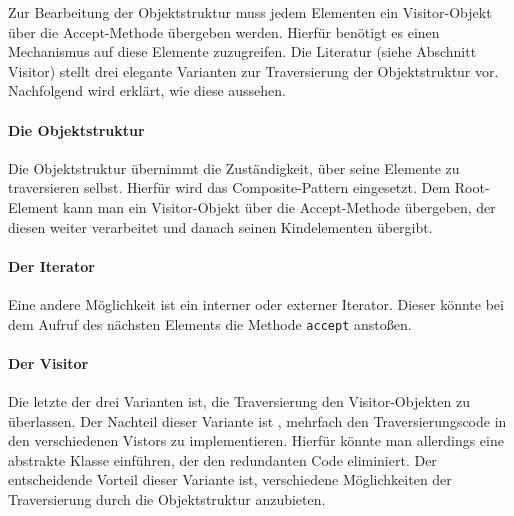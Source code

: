 Zur Bearbeitung der Objektstruktur muss jedem Elementen ein Visitor-Objekt über die Accept-Methode übergeben werden. Hierfür benötigt es einen Mechanismus auf diese Elemente zuzugreifen.
Die Literatur (siehe \cite{GOF95} Abschnitt Visitor) stellt drei elegante Varianten zur Traversierung der Objektstruktur vor. Nachfolgend wird erklärt, wie diese aussehen.
\paragraph{Die Objektstruktur} Die Objektstruktur übernimmt die Zuständigkeit, über seine Elemente zu traversieren selbst. Hierfür wird das Composite-Pattern eingesetzt. Dem Root-Element kann man ein Visitor-Objekt über die Accept-Methode übergeben, der diesen weiter verarbeitet und danach seinen Kindelementen übergibt. 
\paragraph{Der Iterator} Eine andere Möglichkeit ist ein interner oder externer Iterator. Dieser könnte bei dem Aufruf des nächsten Elements die Methode \texttt{accept} anstoßen.
\paragraph{Der Visitor} Die letzte der drei Varianten ist, die Traversierung den Visitor-Objekten zu überlassen. Der Nachteil dieser Variante ist , mehrfach den Traversierungscode in den verschiedenen Vistors zu implementieren. Hierfür könnte man allerdings eine abstrakte Klasse einführen, der den redundanten Code eliminiert. Der entscheidende Vorteil dieser Variante ist, verschiedene Möglichkeiten der Traversierung durch die Objektstruktur anzubieten.



